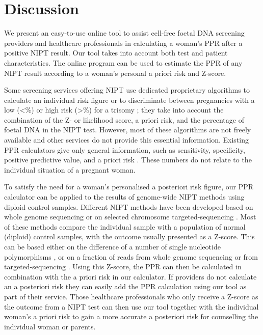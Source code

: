 \section{Discussion}\label{discussion}
We present an easy-to-use online tool to assist cell-free foetal DNA screening providers and healthcare professionals in calculating a woman’s PPR after a positive NIPT result. 
Our tool takes into account both test and patient characteristics. 
The online program can be used to estimate the PPR of any NIPT result according to a woman’s personal a priori risk and Z-score.

Some screening services offering NIPT use dedicated proprietary algorithms to calculate an individual risk figure \cite{Samango_Sprouse_2013} or to discriminate between pregnancies with a low (\textless{}\%) or high risk (\textgreater{}\%) for a trisomy \cite{Sparks_2012a}; they take into account the combination of the Z- or likelihood score, a priori risk, and the percentage of foetal DNA in the NIPT test. 
However, most of these algorithms are not freely available and other services do not provide this essential information. 
Existing PPR calculators give only general information, such as sensitivity, specificity, positive predictive value, and a priori risk \cite{Grace_2015,perinatalquality_org}. 
These numbers do not relate to the individual situation of a pregnant woman.

To satisfy the need for a woman’s personalised a posteriori risk figure, our PPR calculator can be applied to the results of genome-wide NIPT methods using diploid control samples. 
Different NIPT methods have been developed based on whole genome sequencing \cite{Fan_2008,Chiu_2008} or on selected chromosome targeted-sequencing \cite{Zimmermann_2012,Sparks_2012b}. 
Most of these methods compare the individual sample with a population of normal (diploid) control samples, with the outcome usually presented as a Z-score. This can be based either on the difference of a number of single nucleotide polymorphisms \cite{Zimmermann_2012}, or on a fraction of reads from whole genome sequencing \cite{Fan_2008,Chiu_2008} or from targeted-sequencing \cite{Sparks_2012b}. 
Using this Z-score, the PPR can then be calculated in combination with the a priori risk in our calculator. If providers do not calculate an a posteriori risk they can easily add the PPR calculation using our tool as part of their service. 
Those healthcare professionals who only receive a Z-score as the outcome from a NIPT test can then use our tool together with the individual woman’s a priori risk to gain a more accurate a posteriori risk for counselling the individual woman or parents.

